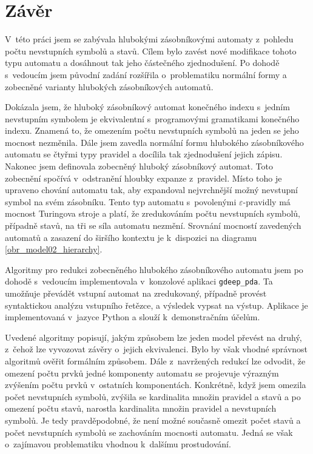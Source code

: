 \chapter{Závěr}


V~této práci jsem se zabývala hlubokými zásobníkovými automaty z~pohledu počtu nevstupních symbolů a stavů. Cílem bylo zavést nové modifikace tohoto typu automatu a dosáhnout tak jeho částečného zjednodušení. Po dohodě s~vedoucím jsem původní zadání rozšířila o~problematiku normální formy a zobecněné varianty hlubokých zásobníkových automatů.

Dokázala jsem, že hluboký zásobníkový automat konečného indexu s~jedním nevstupním symbolem je ekvivalentní s~programovými gramatikami konečného indexu. Znamená to, že omezením počtu nevstupních symbolů na jeden se jeho mocnost nezměnila.  Dále jsem zavedla normální formu hlubokého zásobníkového automatu se čtyřmi typy pravidel a docílila tak zjednodušení jejich zápisu. Nakonec jsem definovala zobecněný hluboký zásobníkový automat. Toto zobecnění spočívá v~odstranění hloubky expanze z~pravidel. Místo toho je upraveno chování automatu tak, aby expandoval nejvrchnější možný nevstupní symbol na svém zásobníku. Tento typ automatu s~povolenými $\varepsilon$-pravidly má mocnost Turingova stroje a platí, že zredukováním počtu nevstupních symbolů, případně stavů, na tři se síla automatu nezmění. Srovnání mocností zavedených automatů a zasazení do širšího kontextu je k~dispozici na diagramu \ref{obr_model02_hierarchy}.


Algoritmy pro redukci zobecněného hlubokého zásobníkového automatu jsem po dohodě s~vedoucím implementovala v~konzolové aplikaci \texttt{gdeep\_pda}. Ta umožňuje převádět vstupní automat na zredukovaný, případně provést syntaktickou analýzu vstupního řetězce, a výsledek vypsat na výstup. Aplikace je implementovaná v~jazyce Python a slouží k~demonstračním účelům. 

Uvedené algoritmy popisují, jakým způsobem lze jeden model převést na druhý, z~čehož lze vyvozovat závěry o~jejich ekvivalenci. Bylo by však vhodné  správnost algoritmů ověřit formálním způsobem. Dále z~navržených redukcí lze odvodit, že omezení počtu prvků jedné komponenty automatu se projevuje výrazným zvýšením počtu prvků v~ostatních komponentách. Konkrétně, když jsem omezila počet nevstupních symbolů, zvýšila se kardinalita množin pravidel a stavů a po omezení počtu stavů, narostla kardinalita množin pravidel a nevstupních symbolů. Je tedy pravděpodobné, že není možné současně omezit počet stavů a počet nevstupních symbolů se zachováním mocnosti automatu. Jedná se však o~zajímavou problematiku vhodnou k~dalšímu prostudování.



